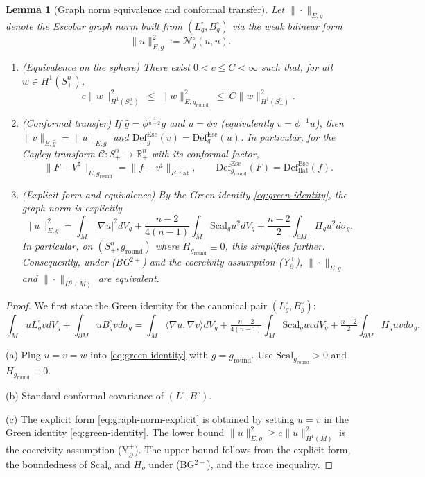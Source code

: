\documentclass[11pt,reqno,a4paper]{amsart}
\newcommand{\R}{\mathbb{R}}
\numberwithin{equation}{section}
\newcommand{\Def}{\mathrm{Def}}
\theoremstyle{plain}
\newtheorem{lemma}[theorem]{Lemma}
\newcommand{\Scal}{\mathrm{Scal}}
\theoremstyle{remark}
\theoremstyle{plain}
\begin{document}
\begin{lemma}[Graph norm equivalence and conformal transfer]\label{lem:graph-norm}
Let $\|\cdot\|_{E,g}$ denote the Escobar graph norm built from $(L_g^{\circ},B_g^{\circ})$ via the weak bilinear form
\[
\|u\|_{E,g}^2:=\mathcal N^\circ_g(u,u).
\]
\begin{enumerate}[label=(\alph*)]
\item (\emph{Equivalence on the sphere}) There exist $0<c\le C<\infty$ such that, for all $w\in H^1(S^n_+)$,
\[
c\|w\|_{H^1(S^n_+)}^2\ \le\ \|w\|_{E,g_{\mathrm{round}}}^2\ \le\ C\|w\|_{H^1(S^n_+)}^2.
\]
\item (\emph{Conformal transfer}) If $\widehat g=\phi^{\frac{4}{n-2}}g$ and $u=\phi v$ (equivalently $v=\phi^{-1}u$), then $\|v\|_{E,\widehat g}=\|u\|_{E,g}$ and $\Def^{\mathrm{Esc}}_{\widehat g}(v)=\Def^{\mathrm{Esc}}_{g}(u)$.
 In particular, for the Cayley transform $\mathcal C:S^n_+\to\R^n_+$ with its conformal factor,
\[
\|F-V^\sharp\|_{E,g_{\mathrm{round}}} = \|f-v^\sharp\|_{E,\mathrm{flat}},
\qquad \Def^{\mathrm{Esc}}_{g_{\mathrm{round}}}(F)=\Def^{\mathrm{Esc}}_{\mathrm{flat}}(f).
\]
\item (\emph{Explicit form and equivalence}) By the Green identity \eqref{eq:green-identity}, the graph norm is explicitly
\begin{equation}\label{eq:graph-norm-explicit}
\|u\|_{E,g}^2 = \int_M |\nabla u|^2dV_g + \frac{n-2}{4(n-1)}\int_M \Scal_gu^2dV_g + \frac{n-2}{2}\int_{\partial M} H_gu^2d\sigma_g.
\end{equation}
In particular, on $(S^n_+,g_{\mathrm{round}})$ where $H_{g_{\mathrm{round}}}\equiv 0$, this simplifies further.
Consequently, under \textup{(BG$^{2+}$)} and the coercivity assumption \textup{(Y$^+_{\partial}$)}, $\|\cdot\|_{E,g}$ and $\|\cdot\|_{H^1(M)}$ are equivalent.
\end{enumerate}
\end{lemma}

\begin{proof}
We first state the Green identity for the canonical pair $(L_g^\circ, B_g^\circ)$:
\begin{equation}\label{eq:green-identity}
\int_M uL_g^{\circ} vdV_g+\int_{\partial M} uB_g^{\circ} vd\sigma_g
= \int_M \langle \nabla u,\nabla v\rangle dV_g
 + \tfrac{n-2}{4(n-1)}\int_M \Scal_gu vdV_g
 + \tfrac{n-2}{2}\int_{\partial M} H_gu vd\sigma_g.
\end{equation}

(a) Plug $u=v=w$ into \eqref{eq:green-identity} with $g=g_{\mathrm{round}}$. Use $\Scal_{g_{\mathrm{round}}}>0$ and $H_{g_{\mathrm{round}}}\equiv0$.

(b) Standard conformal covariance of $(L^\circ,B^\circ)$.

(c) The explicit form \eqref{eq:graph-norm-explicit} is obtained by setting $u=v$ in the Green identity \eqref{eq:green-identity}. The lower bound $\|u\|_{E,g}^2 \ge c \|u\|_{H^1(M)}^2$ is the coercivity assumption \textup{(Y$^+_{\partial}$)}. The upper bound follows from the explicit form, the boundedness of $\Scal_g$ and $H_g$ under \textup{(BG$^{2+}$)}, and the trace inequality.
\end{proof}
\end{document}
